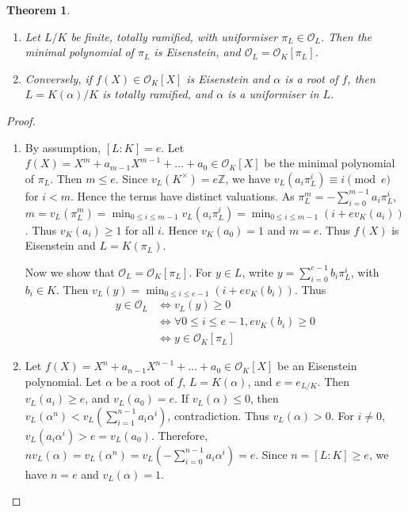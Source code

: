 \documentclass[11pt]{article}
\theoremstyle{definition}
\theoremstyle{plain}
\newtheorem{theorem}[definition]{Theorem}
\theoremstyle{remark}
\newcommand{\ZZ}{\mathbb{Z}}
\newcommand{\cO}{\mathcal{O}}
\begin{document}
\begin{theorem}\label{thm:13_8}\phantom{}
    \begin{enumerate}
        \item Let $L/K$ be finite, totally ramified, with uniformiser $\pi_L \in \cO_L$. Then the minimal polynomial of $\pi_L$ is Eisenstein, and $\cO_L = \cO_K[\pi_L]$.
        \item Conversely, if $f(X) \in \cO_K[X]$ is Eisenstein and $\alpha$ is a root of $f$, then $L = K(\alpha) / K$ is totally ramified, and $\alpha$ is a uniformiser in $L$.
    \end{enumerate}
\end{theorem}
\begin{proof}\phantom{}
    \begin{enumerate}
        \item By assumption, $[L : K] = e$. Let $f(X) = X^m + a_{m-1} X^{m-1} + \ldots + a_0 \in \cO_K[X]$ be the minimal polynomial of $\pi_L$. Then $m \le e$. Since $v_L(K^\times) = e \ZZ$, we have $v_L(a_i \pi_L^i) \equiv i \pmod{e}$ for $i < m$. Hence the terms have distinct valuations. As $\pi_L^m = -\sum_{i=0}^{m-1} a_i \pi_L^i$, $m = v_L(\pi_L^m) = \min_{0 \le i \le m-1} v_L(a_i \pi_L^i) = \min_{0 \le i \le m-1} (i + e v_K(a_i))$. Thus $v_K(a_i) \ge 1$ for all $i$. Hence $v_K(a_0) = 1$ and $m = e$. Thus $f(X)$ is Eisenstein and $L = K(\pi_L)$.

            Now we show that $\cO_L = \cO_K[\pi_L]$. For $y \in L$, write $y = \sum_{i=0}^{e-1} b_i \pi_L^i$, with $b_i \in K$. Then $v_L(y) = \min_{0 \le i \le e-1} (i + e v_K(b_i))$. Thus
            \begin{align*}
                y \in \cO_L
                &\iff v_L(y) \ge 0\\
                &\iff \forall 0 \le i \le e-1, e v_K(b_i) \ge 0\\
                &\iff y \in \cO_K[\pi_L]
            \end{align*}

        \item Let $f(X) = X^n + a_{n-1} X^{n-1} + \ldots + a_0 \in \cO_K[X]$ be an Eisenstein polynomial. Let $\alpha$ be a root of $f$, $L = K(\alpha)$, and $e = e_{L/K}$. Then $v_L(a_i) \ge e$, and $v_L(a_0) = e$. If $v_L(\alpha) \le 0$, then $v_L(\alpha^n) < v_L(\sum_{i=1}^{n-1} a_i \alpha^i)$, contradiction. Thus $v_L(\alpha) > 0$. For $i \neq 0$, $v_L(a_i \alpha^i) > e = v_L(a_0)$. Therefore, $n v_L(\alpha) = v_L(\alpha^n) = v_L(-\sum_{i=0}^{n-1} a_i \alpha^i) = e$. Since $n = [L : K] \ge e$, we have $n = e$ and $v_L(\alpha) = 1$.\qedhere
    \end{enumerate}
\end{proof}
\end{document}
